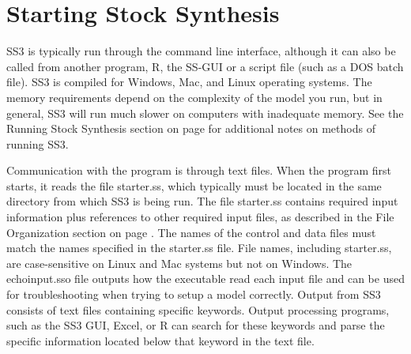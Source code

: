 \pagebreak
		
\section{Starting Stock Synthesis}
SS3 is typically run through the command line interface, although it can also be called from another program, R, the SS-GUI or a script file (such as a DOS batch file). SS3 is compiled for Windows, Mac, and Linux operating systems. The memory requirements depend on the complexity of the model you run, but in general, SS3 will run much slower on computers with inadequate memory. See the Running Stock Synthesis section on page \pageref{sec:RunningSS} for additional notes on methods of running SS3.

Communication with the program is through text files.  When the program first starts, it reads the file starter.ss, which typically must be located in the same directory from which SS3 is being run.  The file starter.ss contains required input information plus references to other required input files, as described in the File Organization section on page \pageref{FileOrganization}.  The names of the control and data files must match the names specified in the starter.ss file.  File names, including starter.ss, are case-sensitive on Linux and Mac systems but not on Windows. The echoinput.sso file outputs how the executable read each input file and can be used for troubleshooting when trying to setup a model correctly.  Output from SS3 consists of text files containing specific keywords.  Output processing programs, such as the SS3 GUI, Excel, or R can search for these keywords and parse the specific information located below that keyword in the text file.

\pagebreak